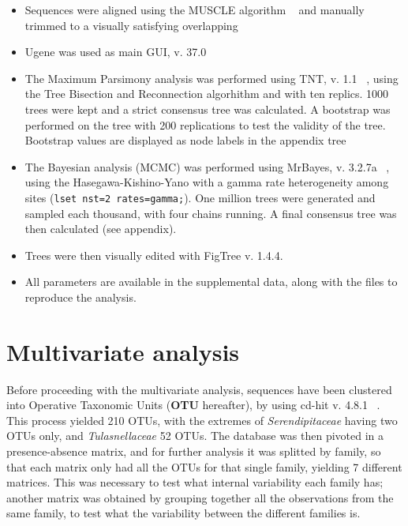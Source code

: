 \begin{itemize}
\item Sequences were aligned using the MUSCLE algorithm ~\citep{edgar2004} and manually trimmed to a visually satisfying overlapping

\item Ugene was used as main GUI, v. 37.0 ~\citep{okonechnikov2012}

\item The Maximum Parsimony analysis was performed using TNT, v. 1.1 ~\citep{tnt}, using the Tree Bisection and Reconnection algorhithm and with ten replics. 1000 trees were kept and a strict consensus tree was calculated. A bootstrap was performed on the tree with 200 replications to test the validity of the tree. Bootstrap values are displayed as node labels in the appendix tree

\item The Bayesian analysis (MCMC) was performed using MrBayes, v. 3.2.7a ~\citep{huelsenbeck2001}, using the Hasegawa-Kishino-Yano with a gamma rate heterogeneity among sites (\texttt{lset nst=2 rates=gamma;}). One million trees were generated and sampled each thousand, with four chains running. A final consensus tree was then calculated (see appendix).

\item Trees were then visually edited with FigTree v. 1.4.4.

\item All parameters are available in the supplemental data, along with the files to reproduce the analysis.

\end{itemize}

\chapter{Multivariate analysis}
\label{multivariateanalysis}

Before proceeding with the multivariate analysis, sequences have been clustered into Operative Taxonomic Units (\textbf{OTU} hereafter), by using cd-hit v. 4.8.1 ~\citep{li2001}. This process yielded 210 OTUs, with the extremes of \emph{Serendipitaceae} having two OTUs only, and \emph{Tulasnellaceae} 52 OTUs.
The database was then pivoted in a presence-absence matrix, and for further analysis it was splitted by family, so that each matrix only had all the OTUs for that single family, yielding 7 different matrices. This was necessary to test what internal variability each family has; another matrix was obtained by grouping together all the observations from the same family, to test what the variability between the different families is.

